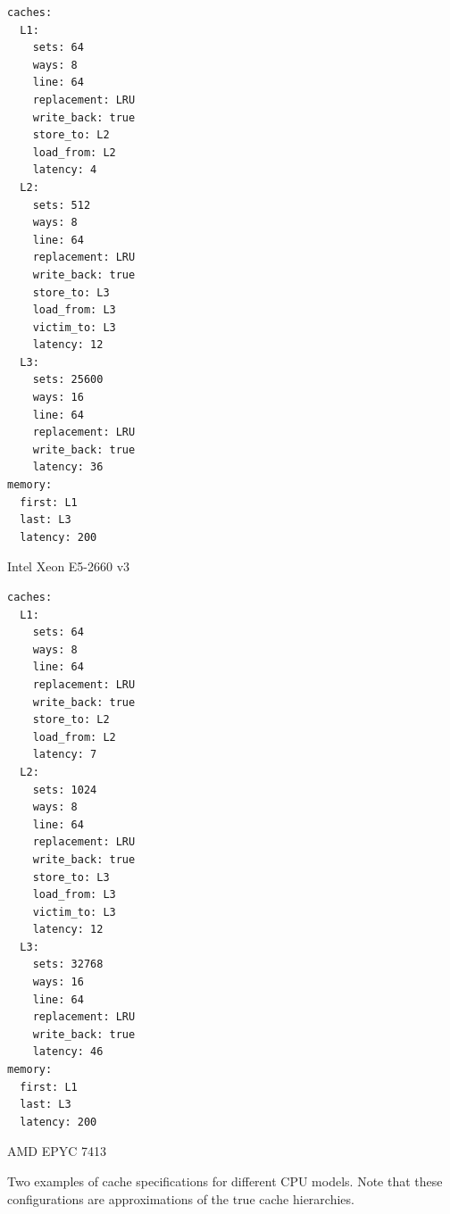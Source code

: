 
\label{sec:results:simulated_hardware}

\begin{lstfloat}
\begin{sublstfloat}[b]{0.49\columnwidth}
\begin{lstlisting}[style=mystyle,frame=tlrb,basicstyle={\scriptsize\ttfamily}]
caches:
  L1:
    sets: 64
    ways: 8
    line: 64
    replacement: LRU
    write_back: true
    store_to: L2
    load_from: L2
    latency: 4
  L2:
    sets: 512
    ways: 8
    line: 64
    replacement: LRU
    write_back: true
    store_to: L3
    load_from: L3
    victim_to: L3
    latency: 12
  L3:
    sets: 25600
    ways: 16
    line: 64
    replacement: LRU
    write_back: true
    latency: 36
memory:
  first: L1
  last: L3
  latency: 200
\end{lstlisting}\vspace{-2mm}
\caption{Intel Xeon E5-2660 v3}
\label{lst:cache_spec:haswell}
\end{sublstfloat}
\begin{sublstfloat}[b]{0.49\columnwidth}
\begin{lstlisting}[style=mystyle,frame=tlrb,basicstyle={\scriptsize\ttfamily}]
caches:
  L1:
    sets: 64
    ways: 8
    line: 64
    replacement: LRU
    write_back: true
    store_to: L2
    load_from: L2
    latency: 7
  L2:
    sets: 1024
    ways: 8
    line: 64
    replacement: LRU
    write_back: true
    store_to: L3
    load_from: L3
    victim_to: L3
    latency: 12
  L3:
    sets: 32768
    ways: 16
    line: 64
    replacement: LRU
    write_back: true
    latency: 46
memory:
  first: L1
  last: L3
  latency: 200
\end{lstlisting}\vspace{-2mm}
\caption{AMD EPYC 7413}
\label{lst:cache_spec:zen3}
\end{sublstfloat}
\caption{Two examples of cache specifications for different CPU models. Note that these configurations are approximations of the true cache hierarchies.}
\label{lst:cache_spec}
\end{lstfloat}

